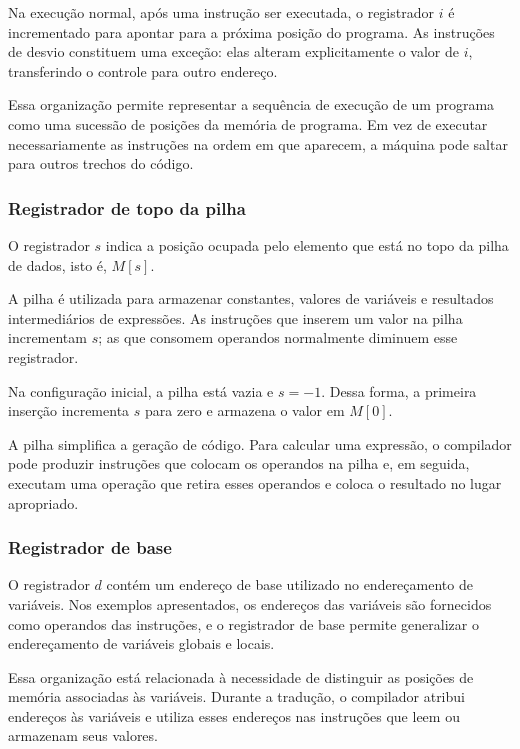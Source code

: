 \documentclass[
  brazilian,
  letterpaper,
]{book}
\theoremstyle{plain}
\theoremstyle{definition}
\theoremstyle{remark}
\begin{document}
Na execução normal, após uma instrução ser executada, o registrador
\(i\) é incrementado para apontar para a próxima posição do programa. As
instruções de desvio constituem uma exceção: elas alteram explicitamente
o valor de \(i\), transferindo o controle para outro endereço.

Essa organização permite representar a sequência de execução de um
programa como uma sucessão de posições da memória de programa. Em vez de
executar necessariamente as instruções na ordem em que aparecem, a
máquina pode saltar para outros trechos do código.

\subsubsection{Registrador de topo da
pilha}\label{registrador-de-topo-da-pilha}

O registrador \(s\) indica a posição ocupada pelo elemento que está no
topo da pilha de dados, isto é, \(M[s]\).

A pilha é utilizada para armazenar constantes, valores de variáveis e
resultados intermediários de expressões. As instruções que inserem um
valor na pilha incrementam \(s\); as que consomem operandos normalmente
diminuem esse registrador.

Na configuração inicial, a pilha está vazia e \(s=-1\). Dessa forma, a
primeira inserção incrementa \(s\) para zero e armazena o valor em
\(M[0]\).

A pilha simplifica a geração de código. Para calcular uma expressão, o
compilador pode produzir instruções que colocam os operandos na pilha e,
em seguida, executam uma operação que retira esses operandos e coloca o
resultado no lugar apropriado.

\subsubsection{Registrador de base}\label{registrador-de-base}

O registrador \(d\) contém um endereço de base utilizado no
endereçamento de variáveis. Nos exemplos apresentados, os endereços das
variáveis são fornecidos como operandos das instruções, e o registrador
de base permite generalizar o endereçamento de variáveis globais e
locais.

Essa organização está relacionada à necessidade de distinguir as
posições de memória associadas às variáveis. Durante a tradução, o
compilador atribui endereços às variáveis e utiliza esses endereços nas
instruções que leem ou armazenam seus valores.
\end{document}
